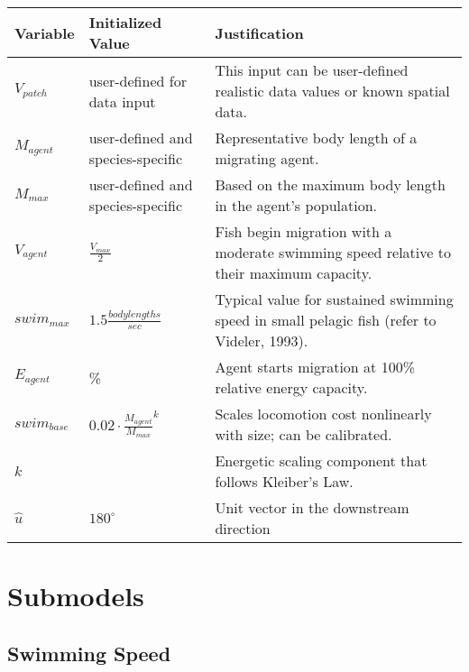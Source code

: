 \documentclass[
]{book}
\begin{document}
\begin{longtable}[]{@{}
  >{\centering\arraybackslash}p{}
  >{\centering\arraybackslash}p{}
  >{\centering\arraybackslash}p{}@{}}
\toprule\noalign{}
\begin{minipage}[b]{\linewidth}\centering
Variable
\end{minipage} & \begin{minipage}[b]{\linewidth}\centering
Initialized Value
\end{minipage} & \begin{minipage}[b]{\linewidth}\centering
Justification
\end{minipage} \\
\midrule\noalign{}
\endhead
\bottomrule\noalign{}
\endlastfoot
\(V_{patch}\) & user-defined for data input & This input can be user-defined realistic data values or known spatial data. \\
\(M_{agent}\) & user-defined and species-specific & Representative body length of a migrating agent. \\
\(M_{max}\) & user-defined and species-specific & Based on the maximum body length in the agent's population. \\
\(V_{agent}\) & \(\frac{V_{max}}{2}\) & Fish begin migration with a moderate swimming speed relative to their maximum capacity. \\
\(swim_{max}\) & \(1.5 \frac{body lengths}{sec}\) & Typical value for sustained swimming speed in small pelagic fish (refer to Videler, 1993). \\
\(E_{agent}\) & 100\% & Agent starts migration at 100\% relative energy capacity. \\
\(swim_{base}\) & \(0.02 \cdot \frac{M_{agent}}{M_{max}}^{k}\) & Scales locomotion cost nonlinearly with size; can be calibrated. \\
\(k\) & 0.75 & Energetic scaling component that follows Kleiber's Law. \\
\(\hat{u}\) & \(180^\circ\) & Unit vector in the downstream direction \\
\end{longtable}

\section{Submodels}\label{submodels-3}

\subsection{Swimming Speed}\label{swimming-speed-1}
\end{document}
